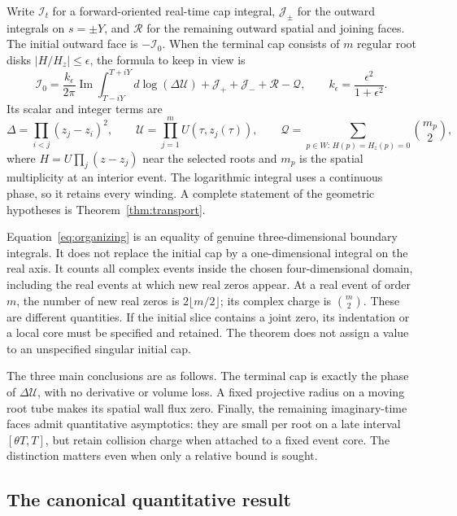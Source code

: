 \documentclass[11pt,letterpaper]{article}
\numberwithin{equation}{section}
\theoremstyle{remark}\newtheorem{remark}[theorem]{Remark}
\newcommand{\im}{\operatorname{Im}}\newcommand{\re}{\operatorname{Re}}
\newcommand{\UU}{\mathscr U}\newcommand{\II}{\mathcal I}
\newcommand{\JJ}{\mathcal J}\newcommand{\QQ}{\mathcal Q}
\newcommand{\RR}{\mathcal R}\newcommand{\dd}{\,d}
\begin{document}
Write $\II_t$ for a forward-oriented real-time cap integral, $\JJ_\pm$
for the outward integrals on $s=\pm Y$, and $\RR$ for the remaining
outward spatial and joining faces. The initial outward face is
$-\II_0$. When the terminal cap consists of $m$ regular root disks
$|H/H_z|\le\epsilon$, the formula to keep in view is
\begin{equation}
 \boxed{\displaystyle
 \II_0=
 \frac{k_\epsilon}{2\pi}\im\int_{T-iY}^{T+iY}
             d\log(\Delta\UU)
 +\JJ_++\JJ_-+\RR-\QQ,\qquad
 k_\epsilon=\frac{\epsilon^2}{1+\epsilon^2}.}
 \label{eq:organizing}
\end{equation}
Its scalar and integer terms are
\begin{equation}
 \Delta=\prod_{i<j}(z_j-z_i)^2,\qquad
 \UU=\prod_{j=1}^m U(\tau,z_j(\tau)),\qquad
 \QQ=\sum_{p\in W:\,H(p)=H_z(p)=0}\binom{m_p}{2},
 \label{eq:terms}
\end{equation}
where $H=U\prod_j(z-z_j)$ near the selected roots and $m_p$ is the
spatial multiplicity at an interior event. The logarithmic integral
uses a continuous phase, so it retains every winding. A complete
statement of the geometric hypotheses is Theorem~\ref{thm:transport}.

Equation~\eqref{eq:organizing} is an equality of genuine
three-dimensional boundary integrals. It does not replace the initial
cap by a one-dimensional integral on the real axis. It counts all
complex events inside the chosen four-dimensional domain, including
the real events at which new real zeros appear. At a real event of
order $m$, the number of new real zeros is $2\lfloor m/2\rfloor$;
its complex charge is $\binom m2$. These are different quantities.
If the initial slice contains a joint zero, its indentation or a local
core must be specified and retained. The theorem does not assign a
value to an unspecified singular initial cap.

The three main conclusions are as follows. The terminal cap is exactly
the phase of $\Delta\UU$, with no derivative or volume loss. A fixed
projective radius on a moving root tube makes its spatial wall flux
zero. Finally, the remaining imaginary-time faces admit quantitative
asymptotics: they are small per root on a late interval $[\theta T,T]$,
but retain collision charge when attached to a fixed event core.
The distinction matters even when only a relative bound is sought.

\subsection{The canonical quantitative result}
\end{document}
